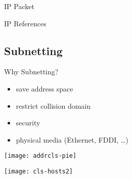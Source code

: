 \begin{frame}{IP Packet}
  \begin{center}
  \end{center}
\end{frame}

\begin{frame}{IP References}
  \begin{refsection}
    \nocite{wiki:ip, wiki:ipaddr, rfc791, wiki:ipv4hdrchksum} \printbibliography[heading=none]
  \end{refsection}
\end{frame}




\subsection{Subnetting}

\begin{frame}{Why Subnetting?}
  \begin{minipage}{.4\linewidth}
    \begin{itemize}
    \item save address space
    \item restrict collision domain
    \item security
    \item physical media (Ethernet, FDDI, \ldots)
    \end{itemize}
    \texttt{[image: addrcls-pie]}
  \end{minipage}\hfill
  \begin{minipage}{.55\linewidth}
    \texttt{[image: cls-hosts2]}
  \end{minipage}
\end{frame}

